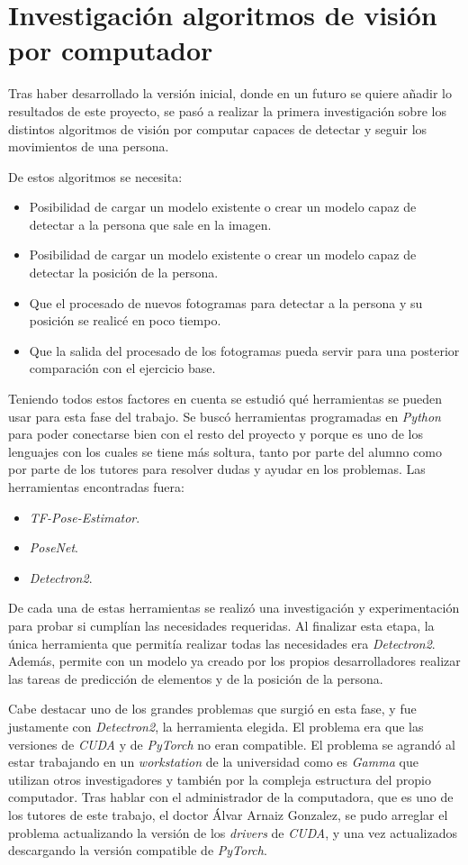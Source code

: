 \section{Investigación algoritmos de visión por computador}
Tras haber desarrollado la versión inicial, donde en un futuro se quiere añadir lo resultados de este proyecto, se pasó a realizar la primera investigación sobre los distintos algoritmos de visión por computar capaces de detectar y seguir los movimientos de una persona. 

De estos algoritmos se necesita:
\begin{itemize}
	\item Posibilidad de cargar un modelo existente o crear un modelo capaz de detectar a la persona que sale en la imagen.
	\item Posibilidad de cargar un modelo existente o crear un modelo capaz de detectar la posición de la persona.
	\item Que el procesado de nuevos fotogramas para detectar a la persona y su posición se realicé en poco tiempo.
	\item Que la salida del procesado de los fotogramas pueda servir para una posterior comparación con el ejercicio base.
\end{itemize}

Teniendo todos estos factores en cuenta se estudió qué herramientas se pueden usar para esta fase del trabajo. Se buscó herramientas programadas en \textit{Python} para poder conectarse bien con el resto del proyecto y porque es uno de los lenguajes con los cuales se tiene más soltura, tanto por parte del alumno como por parte de los tutores para resolver dudas y ayudar en los problemas. Las herramientas encontradas fuera:
\begin{itemize}
	\item \textit{TF-Pose-Estimator}.
	\item \textit{PoseNet}.
	\item \textit{Detectron2}.
\end{itemize}

De cada una de estas herramientas se realizó una investigación y experimentación para probar si cumplían las necesidades requeridas. Al finalizar esta etapa, la única herramienta que permitía realizar todas las necesidades era \textit{Detectron2}. Además, permite con un modelo ya creado por los propios desarrolladores realizar las tareas de predicción de elementos y de la posición de la persona.

Cabe destacar uno de los grandes problemas que surgió en esta fase, y fue justamente con \textit{Detectron2}, la herramienta elegida. El problema era que las versiones de \textit{CUDA} y de \textit{PyTorch} no eran compatible. El problema se agrandó al estar trabajando en un \textit{workstation} de la universidad como es \textit{Gamma} que utilizan otros investigadores y también por la compleja estructura del propio computador. Tras hablar con el administrador de la computadora, que es uno de los tutores de este trabajo, el doctor Álvar Arnaiz Gonzalez, se pudo arreglar el problema actualizando la versión de los \textit{drivers} de \textit{CUDA}, y una vez actualizados descargando la versión compatible de \textit{PyTorch}. 
